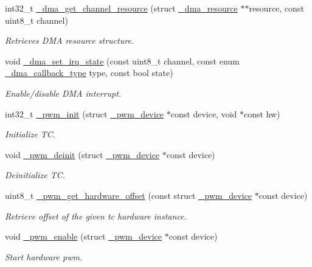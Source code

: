 \begin{DoxyCompactItemize}
int32\+\_\+t \hyperlink{group___h_p_l_ga651aecc566b4d05e988791c85e2efa99}{\+\_\+dma\+\_\+get\+\_\+channel\+\_\+resource} (struct \hyperlink{struct__dma__resource}{\+\_\+dma\+\_\+resource} $\ast$$\ast$resource, const uint8\+\_\+t channel)
\begin{DoxyCompactList}\small\item\em Retrieves D\+MA resource structure. \end{DoxyCompactList}\item 
void \hyperlink{group___h_p_l_ga2b1a1a06af556aa36746d0aada5c6525}{\+\_\+dma\+\_\+set\+\_\+irq\+\_\+state} (const uint8\+\_\+t channel, const enum \hyperlink{group___h_p_l_gaf65002742527ebb1bf4157229990d465}{\+\_\+dma\+\_\+callback\+\_\+type} type, const bool state)
\begin{DoxyCompactList}\small\item\em Enable/disable D\+MA interrupt. \end{DoxyCompactList}\item 
int32\+\_\+t \hyperlink{group___h_p_l_ga15351abaf44430845341bb1da4101792}{\+\_\+pwm\+\_\+init} (struct \hyperlink{struct__pwm__device}{\+\_\+pwm\+\_\+device} $\ast$const device, void $\ast$const hw)
\begin{DoxyCompactList}\small\item\em Initialize TC. \end{DoxyCompactList}\item 
void \hyperlink{group___h_p_l_ga0c2822fd73d42097e88ed03c54338f0f}{\+\_\+pwm\+\_\+deinit} (struct \hyperlink{struct__pwm__device}{\+\_\+pwm\+\_\+device} $\ast$const device)
\begin{DoxyCompactList}\small\item\em Deinitialize TC. \end{DoxyCompactList}\item 
uint8\+\_\+t \hyperlink{group___h_p_l_ga2e9db8f70af92197ac77967d49436aae}{\+\_\+pwm\+\_\+get\+\_\+hardware\+\_\+offset} (const struct \hyperlink{struct__pwm__device}{\+\_\+pwm\+\_\+device} $\ast$const device)
\begin{DoxyCompactList}\small\item\em Retrieve offset of the given tc hardware instance. \end{DoxyCompactList}\item 
void \hyperlink{group___h_p_l_ga784626e8777e650b2904f9a650d128eb}{\+\_\+pwm\+\_\+enable} (struct \hyperlink{struct__pwm__device}{\+\_\+pwm\+\_\+device} $\ast$const device)
\begin{DoxyCompactList}\small\item\em Start hardware pwm. \end{DoxyCompactList}\item 
$$
\end{DoxyCompactItemize}
